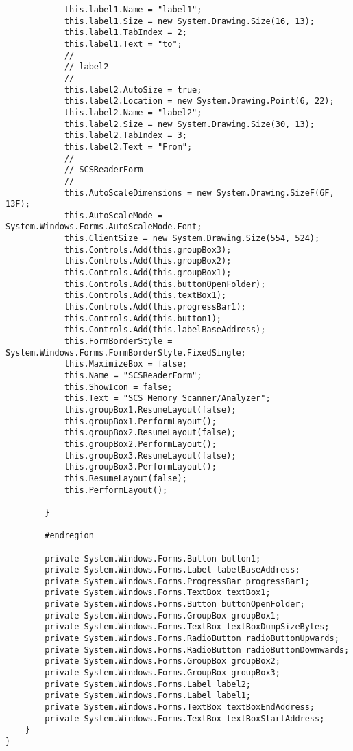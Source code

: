 \begin{lstlisting}
            this.label1.Name = "label1";
            this.label1.Size = new System.Drawing.Size(16, 13);
            this.label1.TabIndex = 2;
            this.label1.Text = "to";
            // 
            // label2
            // 
            this.label2.AutoSize = true;
            this.label2.Location = new System.Drawing.Point(6, 22);
            this.label2.Name = "label2";
            this.label2.Size = new System.Drawing.Size(30, 13);
            this.label2.TabIndex = 3;
            this.label2.Text = "From";
            // 
            // SCSReaderForm
            // 
            this.AutoScaleDimensions = new System.Drawing.SizeF(6F, 13F);
            this.AutoScaleMode = System.Windows.Forms.AutoScaleMode.Font;
            this.ClientSize = new System.Drawing.Size(554, 524);
            this.Controls.Add(this.groupBox3);
            this.Controls.Add(this.groupBox2);
            this.Controls.Add(this.groupBox1);
            this.Controls.Add(this.buttonOpenFolder);
            this.Controls.Add(this.textBox1);
            this.Controls.Add(this.progressBar1);
            this.Controls.Add(this.button1);
            this.Controls.Add(this.labelBaseAddress);
            this.FormBorderStyle = System.Windows.Forms.FormBorderStyle.FixedSingle;
            this.MaximizeBox = false;
            this.Name = "SCSReaderForm";
            this.ShowIcon = false;
            this.Text = "SCS Memory Scanner/Analyzer";
            this.groupBox1.ResumeLayout(false);
            this.groupBox1.PerformLayout();
            this.groupBox2.ResumeLayout(false);
            this.groupBox2.PerformLayout();
            this.groupBox3.ResumeLayout(false);
            this.groupBox3.PerformLayout();
            this.ResumeLayout(false);
            this.PerformLayout();

        }

        #endregion

        private System.Windows.Forms.Button button1;
        private System.Windows.Forms.Label labelBaseAddress;
        private System.Windows.Forms.ProgressBar progressBar1;
        private System.Windows.Forms.TextBox textBox1;
        private System.Windows.Forms.Button buttonOpenFolder;
        private System.Windows.Forms.GroupBox groupBox1;
        private System.Windows.Forms.TextBox textBoxDumpSizeBytes;
        private System.Windows.Forms.RadioButton radioButtonUpwards;
        private System.Windows.Forms.RadioButton radioButtonDownwards;
        private System.Windows.Forms.GroupBox groupBox2;
        private System.Windows.Forms.GroupBox groupBox3;
        private System.Windows.Forms.Label label2;
        private System.Windows.Forms.Label label1;
        private System.Windows.Forms.TextBox textBoxEndAddress;
        private System.Windows.Forms.TextBox textBoxStartAddress;
    }
}
\end{lstlisting}

